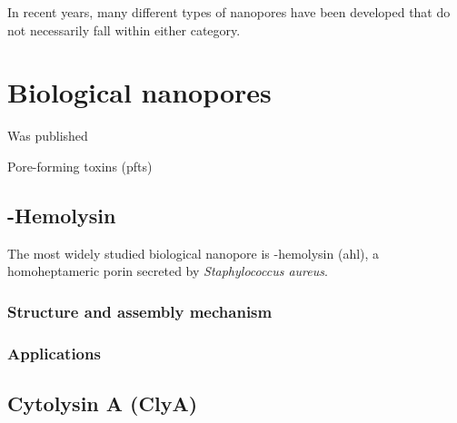 In recent years, many different types of nanopores have been developed that do not necessarily fall within either category. 





\section{Biological nanopores}


Was published \cite{Willems-VanMeervelt-2017}

Pore-forming toxins (\glspl{pft})

\subsection{\textalpha-Hemolysin}

The most widely studied biological nanopore is \textalpha-hemolysin (\gls{ahl}), a homoheptameric porin
secreted by \textit{Staphylococcus aureus}.

\subsubsection{Structure and assembly mechanism}

\subsubsection{Applications}


\subsection{Cytolysin A (ClyA)}

